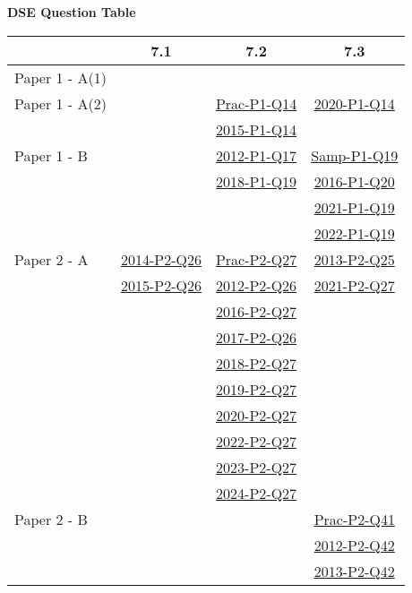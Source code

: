\documentclass[12pt, a4paper]{article}
\begin{document}
\begin{absolutelynopagebreak}
\begin{center}
\textbf{DSE Question Table}
\end{center}
\begin{center}
\begin{tabular}{|l|c|c|c|}
\hline
        & 7.1 & 7.2 & 7.3 \\\hline
\hline
Paper 1 - A(1)&  &  &  \\
\hline
Paper 1 - A(2)&  & \hyperref[DSE2012P-CoreP1-Q14]{Prac-P1-Q14} & \hyperref[DSE2020-CoreP1-Q14]{2020-P1-Q14} \\
&  & \hyperref[DSE2015-CoreP1-Q14]{2015-P1-Q14} &  \\
\hline
Paper 1 - B&  & \hyperref[DSE2012-CoreP1-Q17]{2012-P1-Q17} & \hyperref[DSE2012S-CoreP1-Q19]{Samp-P1-Q19} \\
&  & \hyperref[DSE2018-CoreP1-Q19]{2018-P1-Q19} & \hyperref[DSE2016-CoreP1-Q20]{2016-P1-Q20} \\
&  &  & \hyperref[DSE2021-CoreP1-Q19]{2021-P1-Q19} \\
&  &  & \hyperref[DSE2022-CoreP1-Q19]{2022-P1-Q19} \\
\hline
\hline
Paper 2 - A& \hyperref[DSE2014-CoreP2-Q26]{2014-P2-Q26} & \hyperref[DSE2012P-CoreP2-Q27]{Prac-P2-Q27} & \hyperref[DSE2013-CoreP2-Q25]{2013-P2-Q25} \\
& \hyperref[DSE2015-CoreP2-Q26]{2015-P2-Q26} & \hyperref[DSE2012-CoreP2-Q26]{2012-P2-Q26} & \hyperref[DSE2021-CoreP2-Q27]{2021-P2-Q27} \\
&  & \hyperref[DSE2016-CoreP2-Q27]{2016-P2-Q27} &  \\
&  & \hyperref[DSE2017-CoreP2-Q26]{2017-P2-Q26} &  \\
&  & \hyperref[DSE2018-CoreP2-Q27]{2018-P2-Q27} &  \\
&  & \hyperref[DSE2019-CoreP2-Q27]{2019-P2-Q27} &  \\
&  & \hyperref[DSE2020-CoreP2-Q27]{2020-P2-Q27} &  \\
&  & \hyperref[DSE2022-CoreP2-Q27]{2022-P2-Q27} &  \\
&  & \hyperref[DSE2023-CoreP2-Q27]{2023-P2-Q27} &  \\
&  & \hyperref[DSE2024-CoreP2-Q27]{2024-P2-Q27} &  \\
\hline
Paper 2 - B&  &  & \hyperref[DSE2012P-CoreP2-Q41]{Prac-P2-Q41} \\
&  &  & \hyperref[DSE2012-CoreP2-Q42]{2012-P2-Q42} \\
&  &  & \hyperref[DSE2013-CoreP2-Q42]{2013-P2-Q42} \\

\end{tabular}
\end{center}
\end{absolutelynopagebreak}
\end{document}

